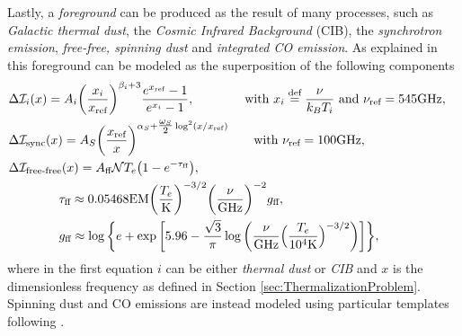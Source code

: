 Lastly, a \emph{foreground} can be produced as the result of many processes, such as \emph{Galactic thermal dust}, the \emph{Cosmic Infrared Background} (CIB), the \emph{synchrotron emission}, \emph{free-free, spinning dust} and \emph{integrated CO emission}. As explained in \cite{constraininginflationarypotentialspectral} this foreground can be modeled as the superposition of the following components
\begin{align}
    &\Delta \mathcal I_i(x)=A_i\bigg(\frac{x_i}{x_{\text{ref}}}\bigg)^{\beta_i+3} \frac{e^{x_{\text{ref}}}-1}{e^{x_i}-1},\qquad\qquad\text{with } x_i\stackrel{\text{def}}{=}\frac{\nu}{k_BT_i}\text{ and } \nu_\text{ref}=545\text{GHz},\label{eq:FOR_i}\\
    &\Delta \mathcal{I}_\text{sync} (x)= A_S\bigg(\frac{x_\text{ref}}{x}\bigg)^{\alpha_S+\tfrac{\omega_S}2\log^2(x/x_\text{ref})}\qquad \text{with }\nu_\text{ref}=100\text{GHz},\label{eq:FOR_sync}\\
    &\Delta \mathcal{I}_\text{free-free}(x)= A_\text{ff} \mathcal{ N} T_e\big(1-e^{-\tau_{\text{ff}}}\big),&\\
    &\qquad\qquad\tau_\text{ff}\approx 0.05468\text{EM}\bigg(\frac{T_e}{\text{K}}\bigg)^{-3/2}\bigg(\frac{\nu}{\text{GHz}}\bigg)^{-2}g_\text{ff},& \\ &\qquad\qquad g_\text{ff}\approx \log\bigg\{ e+\exp\bigg[5.96-\frac{\sqrt{3}}{\pi}\log\bigg(\frac{\nu}{\text{GHz}}\Big(\frac{T_e}{10^4\text{K}}\Big)^{-3/2}\bigg)\bigg]\bigg\},
\end{align}  
where in the first equation $i$ can be either \emph{thermal dust} or \emph{CIB} and $x$ is the dimensionless frequency as defined in Section \ref{sec:ThermalizationProblem}. Spinning dust and CO emissions are instead modeled using particular templates following \cite{refId0,10.1093/mnras/stx1653}.

